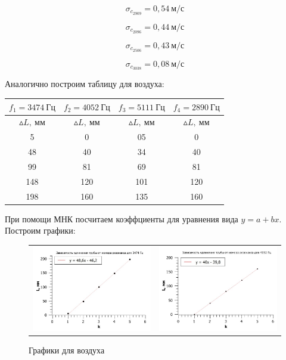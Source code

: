 \documentclass[12pt,a4paper]{article}
\begin{document}
\[\sigma_{c_{2909}} = 0,54  \: \textit{м}/\textit{с}\]

\[\sigma_{c_{2096}} = 0,44  \: \textit{м}/\textit{с}\]

\[\sigma_{c_{2506}} = 0,43  \: \textit{м}/\textit{с}\]

\[\sigma_{c_{3038}} = 0,08  \: \textit{м}/\textit{с}\]

\vspace{0.5cm}

Аналогично построим таблицу для воздуха:

\begin{tabular}{|c|c|c|c|}
\hline 
$f_1 = 3474 \: \textit{Гц}$ & $f_2 = 4052 \: \textit{Гц}$ & $f_3 = 5111 \: \textit{Гц}$ & $f_4 = 2890 \: \textit{Гц}$ \\ 
\hline 
$\vartriangle L, \: \textit{мм}$ & $\vartriangle L, \: \textit{мм}$ & $\vartriangle L, \: \textit{мм}$ & $\vartriangle L, \: \textit{мм}$ \\ 
\hline 
5 & 0 &05 & 0 \\ 
\hline 
48 & 40 & 34 & 40 \\ 
\hline 
99 & 81 & 69 & 81 \\ 
\hline 
148& 120 & 101& 120 \\ 
\hline 
198 & 160 & 135 & 160 \\ 
\hline
\end{tabular}

\vspace{0.5cm}

При помощи МНК посчитаем коэффциенты для уравнения вида $y = a + bx$. Построим графики:

\vspace{0.5cm}

\begin{figure}[ht]\center
\begin{tabular}{cc}
\includegraphics[width=60mm]{V_1-1.jpg}
&
\includegraphics[width=60mm]{V_2-1.jpg}
\end{tabular}
\caption{Графики для воздуха}
\end{figure}
\end{document}
